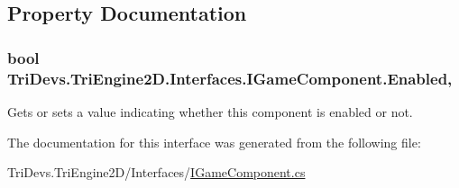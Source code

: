 \subsection{Property Documentation}
\hypertarget{interface_tri_devs_1_1_tri_engine2_d_1_1_interfaces_1_1_i_game_component_a39a7ac64358c6ec66237397a1d053365}{
\subsubsection[{Enabled}]{\setlength{\rightskip}{0pt plus 5cm}bool Tri\-Devs.\-Tri\-Engine2\-D.\-Interfaces.\-I\-Game\-Component.\-Enabled\hspace{0.3cm}{\ttfamily [get]}, {\ttfamily [set]}}}\label{interface_tri_devs_1_1_tri_engine2_d_1_1_interfaces_1_1_i_game_component_a39a7ac64358c6ec66237397a1d053365}


Gets or sets a value indicating whether this component is enabled or not. 



The documentation for this interface was generated from the following file\-:\begin{DoxyCompactItemize}
\item 
Tri\-Devs.\-Tri\-Engine2\-D/\-Interfaces/\hyperlink{_i_game_component_8cs}{I\-Game\-Component.\-cs}\end{DoxyCompactItemize}
